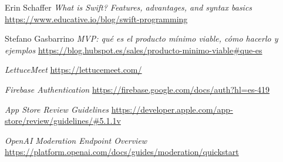 
\begin{thebibliography}{9}
    Erin Schaffer
    \textit{What is Swift? Features, advantages, and syntax basics}
    \url{https://www.educative.io/blog/swift-programming}

    Stefano Gasbarrino
    \textit{MVP: qué es el producto mínimo viable, cómo hacerlo y ejemplos}
    \url{https://blog.hubspot.es/sales/producto-minimo-viable#que-es}

    \textit{LettuceMeet}
    \url{https://lettucemeet.com/}

    \textit{Firebase Authentication}
    \url{https://firebase.google.com/docs/auth?hl=es-419}

    \textit{App Store Review Guidelines}
    \url{https://developer.apple.com/app-store/review/guidelines/#5.1.1v}

    \textit{OpenAI Moderation Endpoint Overview}
    \url{https://platform.openai.com/docs/guides/moderation/quickstart}

\end{thebibliography}